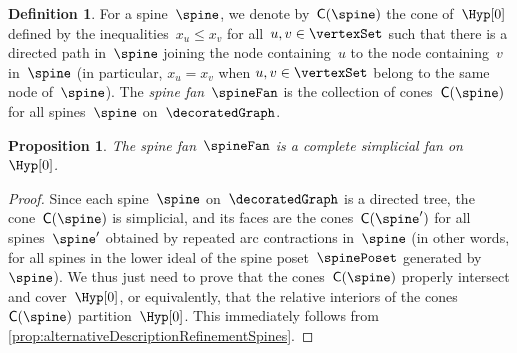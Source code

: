 \documentclass{amsart}
\newtheorem{proposition}[theorem]{Proposition}
\theoremstyle{definition}
\newtheorem{definition}[theorem]{Definition}
\newtheorem{example}[theorem]{Example}
\newcommand{\R}{\mathbb{R}} %
\renewcommand{\b}[1]{{\boldsymbol{#1}}} %
\newcommand{\set}[2]{\left\{ #1 \;\middle|\; #2 \right\}} %
\newcommand{\eqdef}{\mbox{\,\raisebox{0.2ex}{\scriptsize\ensuremath{\mathrm:}}\ensuremath{=}\,}} %
\newcommand{\darkblue}{\color{darkblue}} %
\newcommand{\defn}[1]{\textsl{\darkblue #1}} %
\newcommand{\vincent}[1]{\todo[color=blue!30]{#1 \\ \hfill --- V.}}
\newcommand{\normalCone}{\mathsf{C}} %
\begin{document}
%
%

\begin{definition}
  \label{def:spineFan}
  For a spine~$\spine$, we denote by~$\normalCone(\spine)$ the cone of~$\Hyp[0]$ defined by the inequalities~${x_u \le x_v}$ for all~$u,v \in \vertexSet$ such that there is a directed path in~$\spine$ joining the node containing~$u$ to the node containing~$v$ in~$\spine$ (in particular, $x_u = x_v$ when $u,v \in \vertexSet$ belong to the same node of~$\spine$).
  The \defn{spine fan}~$\spineFan$ is the collection of cones~$\normalCone(\spine)$ for all spines~$\spine$ on~$\decoratedGraph$.  
\end{definition}

\begin{proposition}
  \label{prop:spineFan}
  The spine fan~$\spineFan$ is a complete simplicial fan on~$\Hyp[0]$.
\end{proposition}

\begin{proof}
  Since each spine~$\spine$ on~$\decoratedGraph$ is a directed tree, the cone~$\normalCone(\spine)$ is simplicial, and its faces are the cones~$\normalCone(\spine')$ for all spines~$\spine'$ obtained by repeated arc contractions in~$\spine$ (in other words, for all spines in the lower ideal of the spine poset~$\spinePoset$ generated by~$\spine$).
  We thus just need to prove that the cones~$\normalCone(\spine)$ properly intersect and cover~$\Hyp[0]$, or equivalently, that the relative interiors of the cones~$\normalCone(\spine)$ partition~$\Hyp[0]$.
  This immediately follows from \cref{prop:alternativeDescriptionRefinementSpines}.
\end{proof}
\end{document}
